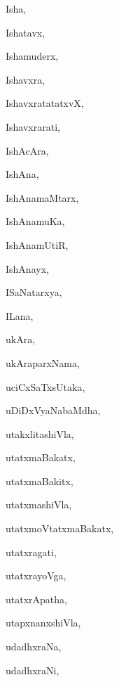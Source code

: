 \begin{multicols}{3}
{\noindent
{Isha}, \pageref{Isha}

\noindent
{Ishatavx}, \pageref{Ishatavx}

\noindent
{Ishamuderx}, \pageref{Ishamuderx}

\noindent
{Ishavxra}, \pageref{Ishavxra}

\noindent
{IshavxratatatxvX}, \pageref{IshavxratatatxvX}

\noindent
{Ishavxrarati}, \pageref{Ishavxrarati}

\noindent
{IshAcAra}, \pageref{IshAcAra}

\noindent
{IshAna}, \pageref{IshAna}

\noindent
{IshAnamaMtarx}, \pageref{IshAnamaMtarx}

\noindent
{IshAnamuKa}, \pageref{IshAnamuKa}

\noindent
{IshAnamUtiR}, \pageref{IshAnamUtiR}

\noindent
{IshAnayx}, \pageref{IshAnayx}

\noindent
{ISaNatarxya}, \pageref{ISaNatarxya}

\noindent
{ILana}, \pageref{ILana}

\bigskip
\noindent
{}
\smallskip

\noindent
{ukAra}, \pageref{ukAra}

\noindent
{ukAraparxNama}, \pageref{ukAraparxNama}

\noindent
{uciCxSaTxsUtaka}, \pageref{uciCxSaTxsUtaka}

\noindent
{uDiDxVyaNabaMdha}, \pageref{uDiDxVyaNabaMdha}

\noindent
{utakxlitashiVla}, \pageref{utakxlitashiVla}

\noindent
{utatxmaBakatx}, \pageref{utatxmaBakatx}

\noindent
{utatxmaBakitx}, \pageref{utatxmaBakitx}

\noindent
{utatxmashiVla}, \pageref{utatxmashiVla}

\noindent
{utatxmoVtatxmaBakatx}, \pageref{utatxmoVtatxmaBakatx}

\noindent
{utatxragati}, \pageref{utatxragati}

\noindent
{utatxrayoVga}, \pageref{utatxrayoVga}

\noindent
{utatxrApatha}, \pageref{utatxrApatha}

\noindent
{utapxnanxshiVla}, \pageref{utapxnanxshiVla}

\noindent
{udadhxraNa}, \pageref{udadhxraNa}

\noindent
{udadhxraNi}, \pageref{udadhxraNi}

}
\end{multicols}
